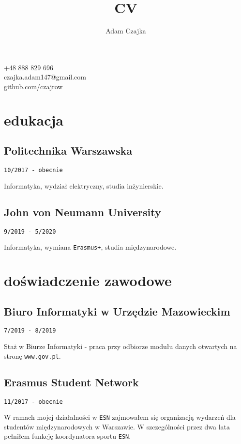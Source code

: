 \documentclass{article}
\makeatletter
\renewcommand{\maketitle}{
    \begin{center}



        {\huge\bfseries\theauthor}

        \vspace{.25em}

        +48 888 829 696\\czajka.adam147@gmail.com\\github.com/czajrow
	\end{center}
	\vspace{-.5cm}
}
\makeatother
\begin{document}
\title{CV}
\author{Adam Czajka}

\maketitle

\vspace{2em}

\begin{minipage}[t]{.5\textwidth}

	\section{edukacja}
	\subsection{Politechnika Warszawska}
	\texttt{10/2017 - obecnie}
	\par Informatyka, wydział elektryczny, studia inżynierskie.

	\subsection{John von Neumann University}
	\texttt{9/2019 - 5/2020}
	\par Informatyka, wymiana \texttt{Erasmus+}, studia międzynarodowe.

	\vspace{2em}

	\section{doświadczenie zawodowe}

	\subsection{Biuro Informatyki w Urzędzie Mazowieckim}
	\texttt{7/2019 - 8/2019}
	\par Staż w Biurze Informatyki - praca przy odbiorze modułu danych otwartych na stronę \texttt{www.gov.pl}.

	\subsection{Erasmus Student Network}
	\texttt{11/2017 - obecnie}
	\par W ramach mojej działalności w \texttt{ESN} zajmowałem się organizacją wydarzeń dla studentów międzynarodowych w Warszawie. W szczególności przez dwa lata pełniłem funkcję koordynatora sportu \texttt{ESN}.


\end{minipage}
\end{document}
